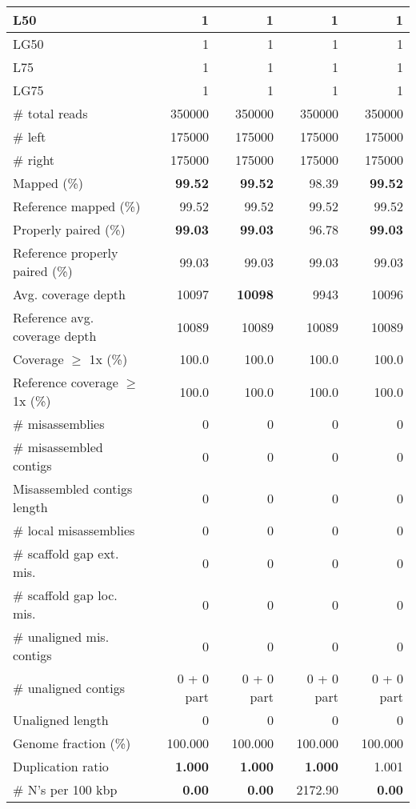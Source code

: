 \documentclass[12pt,a4paper]{article}
\begin{document}
\begin{table}[ht]
\begin{center}
\begin{tabular}{|l*{4}{|r}|}
L50 & 1 & 1 & 1 & 1 \\ \hline
LG50 & 1 & 1 & 1 & 1 \\ \hline
L75 & 1 & 1 & 1 & 1 \\ \hline
LG75 & 1 & 1 & 1 & 1 \\ \hline
\# total reads & 350000 & 350000 & 350000 & 350000 \\ \hline
\# left & 175000 & 175000 & 175000 & 175000 \\ \hline
\# right & 175000 & 175000 & 175000 & 175000 \\ \hline
Mapped (\%) & {\bf 99.52} & {\bf 99.52} & 98.39 & {\bf 99.52} \\ \hline
Reference mapped (\%) & 99.52 & 99.52 & 99.52 & 99.52 \\ \hline
Properly paired (\%) & {\bf 99.03} & {\bf 99.03} & 96.78 & {\bf 99.03} \\ \hline
Reference properly paired (\%) & 99.03 & 99.03 & 99.03 & 99.03 \\ \hline
Avg. coverage depth & 10097 & {\bf 10098} & 9943 & 10096 \\ \hline
Reference avg. coverage depth & 10089 & 10089 & 10089 & 10089 \\ \hline
Coverage $\geq$ 1x (\%) & 100.0 & 100.0 & 100.0 & 100.0 \\ \hline
Reference coverage $\geq$ 1x (\%) & 100.0 & 100.0 & 100.0 & 100.0 \\ \hline
\# misassemblies & 0 & 0 & 0 & 0 \\ \hline
\# misassembled contigs & 0 & 0 & 0 & 0 \\ \hline
Misassembled contigs length & 0 & 0 & 0 & 0 \\ \hline
\# local misassemblies & 0 & 0 & 0 & 0 \\ \hline
\# scaffold gap ext. mis. & 0 & 0 & 0 & 0 \\ \hline
\# scaffold gap loc. mis. & 0 & 0 & 0 & 0 \\ \hline
\# unaligned mis. contigs & 0 & 0 & 0 & 0 \\ \hline
\# unaligned contigs & 0 + 0 part & 0 + 0 part & 0 + 0 part & 0 + 0 part \\ \hline
Unaligned length & 0 & 0 & 0 & 0 \\ \hline
Genome fraction (\%) & 100.000 & 100.000 & 100.000 & 100.000 \\ \hline
Duplication ratio & {\bf 1.000} & {\bf 1.000} & {\bf 1.000} & 1.001 \\ \hline
\# N's per 100 kbp & {\bf 0.00} & {\bf 0.00} & 2172.90 & {\bf 0.00} \\ \hline

\end{tabular}
\end{center}
\end{table}
\end{document}
